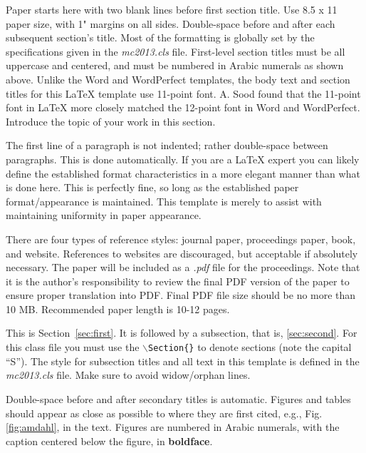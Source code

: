 \documentclass{ansconf}
\begin{document}

Paper starts here with two blank lines before first section title.  Use 
8.5 x 11 paper size, with 1" margins on all sides.  Double-space before and
after each subsequent section's title.  Most of the formatting is globally
set by the specifications given in the {\it mc2013.cls} file.  
First-level section titles must be all uppercase and centered, and must 
be numbered in Arabic numerals as shown above.  Unlike the Word and WordPerfect
templates, the body text and section titles for this {\LaTeX} template use 
11-point font.  A. Sood found that the 11-point font in {\LaTeX} more closely 
matched the 12-point font in Word and WordPerfect.  Introduce the topic of 
your work in this section.

The first line of a paragraph is not indented; rather double-space between 
paragraphs.  This is done automatically. If you are a {\LaTeX} expert you 
can likely define the established format characteristics in a more elegant 
manner than what is done here.  This is perfectly fine, so long as the 
established paper format/appearance is maintained.  This template is merely 
to assist with maintaining uniformity in paper appearance.

There are four types of reference styles: journal paper\cite{journal},
proceedings paper\cite{proc_paper}, book\cite{book}, and website\cite{techrep}.
References to websites are discouraged, but acceptable if absolutely necessary.
The paper will be included as a {\it .pdf} file for the proceedings. Note that
it is the author's responsibility to review the final PDF version of the paper
to ensure proper translation into PDF.  Final PDF file size should be no more
than 10 MB. Recommended paper length is 10-12 pages.

\label{sec:first}

This is Section~\ref{sec:first}. It is followed by a subsection, that is, 
\ref{sec:second}. For this class file you must use the 
\texttt{$\backslash$Section\{\}} to denote sections (note the capital ``S'').  
The style for subsection titles and all text in this template is defined in 
the {\it mc2013.cls} file.  Make sure to avoid widow/orphan lines.


\label{sec:second}

Double-space before and after secondary titles is automatic.  Figures and 
tables should appear as close as possible to where they are first
cited, e.g., Fig. \ref{fig:amdahl}, in the text.  Figures are numbered in 
Arabic numerals, with the caption centered below the figure, in 
{\bf boldface}.
  
\end{document}
